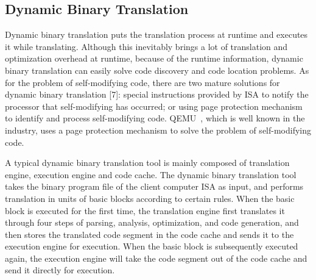 \subsection{Dynamic Binary Translation}
Dynamic binary translation puts the translation process at runtime and executes it while translating. 
Although this inevitably brings a lot of translation and optimization overhead at runtime, because of the runtime information, dynamic binary translation can easily solve code discovery and code location problems. 
As for the problem of self-modifying code, there are two mature solutions for dynamic binary translation [7]: special instructions provided by ISA to notify the processor that self-modifying has occurred; or using page protection mechanism to identify and process self-modifying code. 
QEMU~\cite{DBLP:conf/usenix/Bellard05}, which is well known in the industry, uses a page protection mechanism to solve the problem of self-modifying code.

A typical dynamic binary translation tool is mainly composed of translation engine, execution engine and code cache. 
The dynamic binary translation tool takes the binary program file of the client computer ISA as input, and performs translation in units of basic blocks according to certain rules. 
When the basic block is executed for the first time, the translation engine first translates it through four steps of parsing, analysis, optimization, and code generation, and then stores the translated code segment in the code cache and sends it to the execution engine for execution. 
When the basic block is subsequently executed again, the execution engine will take the code segment out of the code cache and send it directly for execution.
